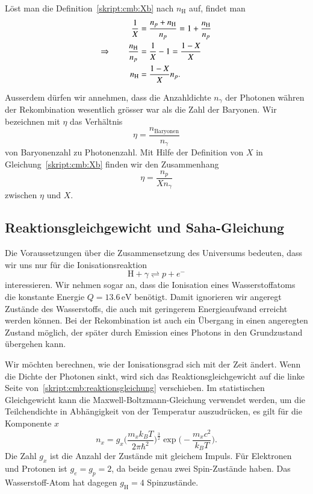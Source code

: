 Löst man die Definition~\eqref{skript:cmb:Xb} nach $n_\text{H}$ auf,
findet man
\begin{align}
\frac1X
&=
\frac{n_p+n_\text{H}}{n_p}
=
1+
\frac{n_\text{H}}{n_p}
\notag
\\
\Rightarrow
\qquad
\frac{n_\text{H}}{n_p}
&=
\frac{1}{X}-1
=
\frac{1-X}{X}
\notag
\\
n_\text{H}
&=
\frac{1-X}{X}n_p.
\label{skript:cmb:XnH}
\end{align}

Ausserdem dürfen wir annehmen, dass die Anzahldichte $n_\gamma$
der Photonen währen der Rekombination wesentlich grösser war als
die Zahl der Baryonen.
Wir bezeichnen mit $\eta$ das Verhältnis
\[
\eta = \frac{n_\text{Baryonen}}{n_\gamma}
\]
von Baryonenzahl zu Photonenzahl.
Mit Hilfe der Definition von $X$ in Gleichung~\eqref{skript:cmb:Xb}
finden wir den Zusammenhang
\begin{equation}
\eta = \frac{n_p}{Xn_\gamma}
\label{skript:cmb:etaX}
\end{equation}
zwischen $\eta$ und $X$.

\subsection{Reaktionsgleichgewicht und Saha-Gleichung}
Die Voraussetzungen über die Zusammensetzung des Universums bedeuten,
dass wir uns nur für die Ionisationsreaktion
\begin{equation}
\text{H} + \gamma 
\rightleftharpoons
p + e^-
\label{skript:cmb:reaktionsgleichung}
\end{equation}
interessieren.
Wir nehmen sogar an, dass die Ionisation eines Wasserstoffatoms 
die konstante Energie $Q=13.6\,\text{eV}$ benötigt.
Damit ignorieren wir angeregt Zustände des Wasserstoffs, die auch
mit geringerem Energieaufwand erreicht werden können.
Bei der Rekombination ist auch ein Übergang in einen angeregten
Zustand möglich, der später durch Emission eines Photons in den Grundzustand
übergehen kann.

Wir möchten berechnen, wie der Ionisationsgrad sich mit der Zeit ändert.
Wenn die Dichte der Photonen sinkt, wird sich das Reaktionsgleichgewicht
auf die linke Seite von~\eqref{skript:cmb:reaktionsgleichung} verschieben.
Im statistischen Gleichgewicht kann die Maxwell-Boltzmann-Gleichung
verwendet werden, um die Teilchendichte in Abhängigkeit von der Temperatur
auszudrücken, es gilt für die Komponente $x$
\[
n_x
=
g_x \biggl(\frac{m_xk_BT}{2\pi \hbar^2}\biggr)^{\frac32}
\exp\biggl(-\frac{m_xc^2}{k_BT}\biggr).
\]
Die Zahl $g_x$ ist die Anzahl der Zustände mit gleichem Impuls.
Für Elektronen und Protonen ist $g_e=g_p=2$, da beide genau zwei
Spin-Zustände haben.
Das Wasserstoff-Atom hat dagegen $g_\text{H}=4$ Spinzustände.

